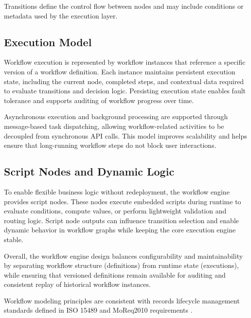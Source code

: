 Transitions define the control flow between nodes and may include conditions or metadata used by the execution layer.

\subsection{Execution Model}

Workflow execution is represented by workflow instances that reference a specific version of a workflow definition. 
Each instance maintains persistent execution state, including the current node, completed steps, and contextual data required to evaluate transitions and decision logic. 
Persisting execution state enables fault tolerance and supports auditing of workflow progress over time.

Asynchronous execution and background processing are supported through message-based task dispatching, 
allowing workflow-related activities to be decoupled from synchronous API calls. 
This model improves scalability and helps ensure that long-running workflow steps do not block user interactions.

\subsection{Script Nodes and Dynamic Logic}

To enable flexible business logic without redeployment, the workflow engine provides script nodes. 
These nodes execute embedded scripts during runtime to evaluate conditions, compute values, 
or perform lightweight validation and routing logic. Script node outputs can influence transition selection 
and enable dynamic behavior in workflow graphs while keeping the core execution engine stable.

Overall, the workflow engine design balances configurability and maintainability by separating workflow structure (definitions) from runtime state (executions), 
while ensuring that versioned definitions remain available for auditing and consistent replay of historical workflow instances.


Workflow modeling principles are consistent with records lifecycle management standards defined in ISO 15489 \cite{iso15489} and MoReq2010 requirements \cite{moreq2010}.
